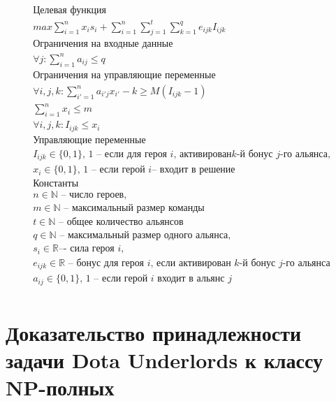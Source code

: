 \documentclass{article}
\begin{document}
\begin{equation}
\label{eq:DUIP}
\begin{gathered}
\textbf{Целевая функция}\\
max \sum_{i=1}^{n} x_i s_i + \sum_{i=1}^{n} \sum_{j=1}^{t}  \sum_{k=1}^{q} e_{ijk} I_{ijk} \\
\textbf{Ограничения на входные данные}\\
\forall{j} : \sum_{i=1}^n a_{ij} \le q \\
\textbf{Ограничения на управляющие переменные} \\
\forall{i,j,k} :  \sum_{i'=1}^{n} a_{i'j} x_{i'} - k \ge M( I_{ijk}  - 1) \\
\sum_{i=1}^n x_i \le m   \\ 
\forall{i,j,k} :  I_{ijk}  \le x_i \\
\textbf{Управляющие переменные} \\
I_{ijk} \in \{0, 1\} \text {, 1 – если для героя } i \text{, активирован} k\text{-й бонус } j \text{-го альянса,} \\
x_i  \in \{0, 1\} \text{, 1 -- если герой } i \text{– входит в решение} \\
\textbf{Константы} \\
n \in \mathbb{N} \text{ -- число героев,} \\
m \in \mathbb{N} \text{ -- максимальный размер команды}\\
t \in \mathbb{N} \text{ -- общее количество альянсов} \\
q \in \mathbb{N} \text{ -- максимальный размер одного альянса,} \\
s_i  \in \mathbb{R} \text{–- сила героя } i, \\
e_{ijk} \in \mathbb{R} \text{ -- бонус для героя } i \text{,  если активирован } k
\text{-й бонус } j \text{-го альянса} \\
a_{ij} \in \{0, 1\} \text{, 1 -- если герой } i \text{ входит в альянс } j \\ 
\end{gathered}
\end{equation}

\section{Доказательство принадлежности задачи Dota Underlords к классу NP-полных}
\label{SectionNPCompleteProof}
\end{document}
